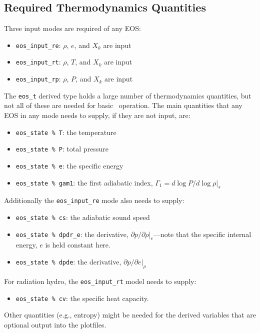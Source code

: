 \subsection{Required Thermodynamics Quantities}

Three input modes are required of any EOS:
\begin{itemize}
\item {\tt eos\_input\_re}: $\rho$, $e$, and $X_k$ are input
\item {\tt eos\_input\_rt}: $\rho$, $T$, and $X_k$ are input
\item {\tt eos\_input\_rp}: $\rho$, $P$, and $X_k$ are input
\end{itemize}

The {\tt eos\_t} derived type holds a large number of thermodynamics
quantities, but not all of these are needed for basic
\castro\ operation.  The main quantities that any EOS in any mode needs to
supply, if they are not input, are:
\begin{itemize}
  \item {\tt eos\_state \% T}: the temperature
  \item {\tt eos\_state \% P}: total pressure
  \item {\tt eos\_state \% e}: the specific energy
  \item {\tt eos\_state \% gam1}: the first adiabatic index,
       $\Gamma_1 = d\log P / d\log \rho |_s$
\end{itemize}

Additionally the {\tt eos\_input\_re} mode also needs to supply:
\begin{itemize}
  \item {\tt eos\_state \% cs}: the adiabatic sound speed
  \item {\tt eos\_state \% dpdr\_e}: the derivative, $\partial
    p/\partial \rho |_e$---note that the specific internal energy, $e$
    is held constant here.
  \item {\tt eos\_state \% dpde}: the derivative, $\partial p /
    \partial e |_\rho$
\end{itemize}

For radiation hydro, the {\tt eos\_input\_rt} model needs to supply:
\begin{itemize}
  \item {\tt eos\_state \% cv}: the specific heat capacity.
\end{itemize}
Other quantities (e.g., entropy) might be needed for the derived
variables that are optional output into the plotfiles.


